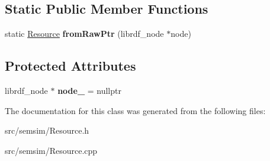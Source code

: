 \subsection*{Static Public Member Functions}
\begin{DoxyCompactItemize}
\item 
\mbox{\label{classsemsim_1_1Resource_acd6aab8a740d559b10be2312c5f76bcc}} 
static \hyperlink{classsemsim_1_1Resource}{Resource} {\bfseries from\+Raw\+Ptr} (librdf\+\_\+node $\ast$node)
\end{DoxyCompactItemize}
\subsection*{Protected Attributes}
\begin{DoxyCompactItemize}
\item 
\mbox{\label{classsemsim_1_1Resource_a7327d3c42a342a43e1c0a676065a659f}} 
librdf\+\_\+node $\ast$ {\bfseries node\+\_\+} = nullptr
\end{DoxyCompactItemize}


The documentation for this class was generated from the following files\+:\begin{DoxyCompactItemize}
\item 
src/semsim/Resource.\+h\item 
src/semsim/Resource.\+cpp\end{DoxyCompactItemize}
